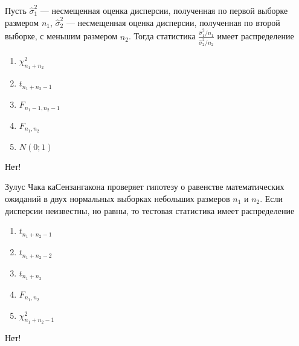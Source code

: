 \documentclass[t]{beamer}
\begin{document}
 \begin{frame} \label{24-No} 
\begin{block}{24} 

Пусть  $\hat{\sigma}^2_1$ — несмещенная оценка дисперсии, полученная по первой выборке размером $n_1$,   $\hat{\sigma}^2_2$ — несмещенная оценка дисперсии, полученная по второй выборке, с меньшим размером  $n_2$. Тогда статистика $\frac{\hat{\sigma}^2_1/n_1}{\hat{\sigma}^2_2/n_2}$  имеет распределение
 


 \end{block} 
\begin{enumerate} 
\item[] \hyperlink{24-No}{\beamergotobutton{} $\chi^2_{n_1+n_2}$}
\item[] \hyperlink{24-No}{\beamergotobutton{} $t_{n_1+n_2-1}$}
\item[] \hyperlink{24-No}{\beamergotobutton{} $F_{n_1-1,n_2-1}$}
\item[] \hyperlink{24-No}{\beamergotobutton{} $F_{n_1,n_2}$}
\item[] \hyperlink{24-No}{\beamergotobutton{} $N(0;1)$}
\end{enumerate} 

 \alert{Нет!} 
\end{frame} 


 \begin{frame} \label{25-No} 
\begin{block}{25} 

Зулус Чака каСензангакона проверяет гипотезу  о равенстве математических ожиданий в двух нормальных выборках небольших размеров $n_1$   и  $n_2$. Если дисперсии неизвестны, но равны, то тестовая статистика имеет распределение
 


 \end{block} 
\begin{enumerate} 
\item[] \hyperlink{25-No}{\beamergotobutton{} $t_{n_1+n_2-1}$}
\item[] \hyperlink{25-Yes}{\beamergotobutton{} $t_{n_1+n_2-2}$}
\item[] \hyperlink{25-No}{\beamergotobutton{} $t_{n_1+n_2}$}
\item[] \hyperlink{25-No}{\beamergotobutton{} $F_{n_1,n_2}$}
\item[] \hyperlink{25-No}{\beamergotobutton{} $\chi^2_{n_1+n_2-1}$}
\end{enumerate} 

 \alert{Нет!} 
\end{frame} 
\end{document}
